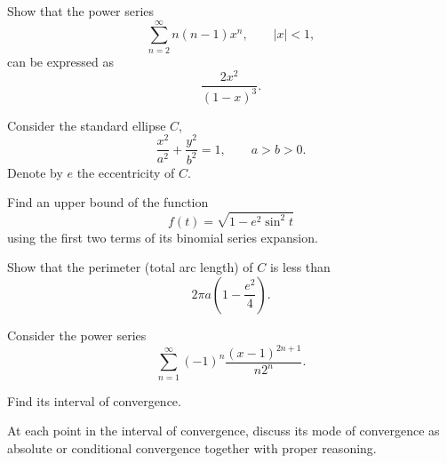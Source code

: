 \begin{problem}
Show that the power series
\[
\sum_{n=2}^{\infty}n(n-1)x^n,
\qquad |x|<1,
\]
can be expressed as
\[
\frac{2x^2}{(1-x)^3}.
\]
\end{problem}

\begin{problem}
Consider the standard ellipse $C$,
\[
\frac{x^2}{a^2}+\frac{y^2}{b^2}=1,
\qquad a>b>0.
\]
Denote by $e$ the eccentricity of $C$.
\begin{problemsubparts}
\item Find an upper bound of the function
\[
f(t)=\sqrt{1-e^2\sin^2 t}
\]
using the first two terms of its binomial series expansion.
\item Show that the perimeter (total arc length) of $C$ is less than
\[
2\pi a\left(1-\frac{e^2}{4}\right).
\]
\end{problemsubparts}
\end{problem}

\begin{problem}
Consider the power series
\[
\sum_{n=1}^{\infty}(-1)^n\frac{(x-1)^{2n+1}}{n2^n}.
\]
\begin{problemsubparts}
\item Find its interval of convergence.
\item At each point in the interval of convergence, discuss its mode of convergence as absolute or conditional convergence together with proper reasoning.
\end{problemsubparts}
\end{problem}

